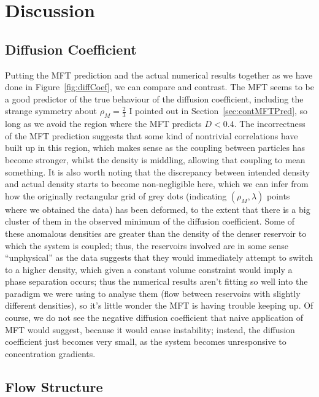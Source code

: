 \section{Discussion} \label{sec:conc}
\subsection{Diffusion Coefficient}
Putting the MFT prediction and the actual numerical results together as we have done in Figure~\ref{fig:diffCoef}, we can compare and contrast. The MFT seems to be a good predictor of the true behaviour of the diffusion coefficient,
including the strange symmetry about $\rho_M=\frac{2}{3}$ I pointed out in Section~\ref{sec:contMFTPred}, so long as we avoid the region where the MFT predicts $D<0.4$. The incorrectness of the MFT prediction suggests that some kind of nontrivial
correlations have built up in this region, which makes sense as the coupling between particles has become stronger, whilst the density is middling, allowing that coupling to mean something. It is also worth noting that the discrepancy between
intended density and actual density starts to become non-negligible here, which we can infer from how the originally rectangular grid of grey dots
(indicating $(\rho_M, \lambda)$ points where we obtained the data) has been deformed, to the extent that there is a big cluster of them in the observed minimum of the diffusion coefficient. Some of these anomalous densities are greater
than the density of the denser reservoir to which the system is coupled; thus, the reservoirs involved are in some sense ``unphysical'' as the data suggests that they would immediately attempt to switch to a higher density, which given a
constant volume constraint would imply a phase separation occurs; thus the numerical results aren't fitting so well into the paradigm we were using to analyse them (flow between reservoirs with slightly different densities),
so it's little wonder the MFT is having trouble keeping up. Of course, we do not see the negative diffusion coefficient that naive application of MFT would suggest, because it would cause instability; instead, the diffusion coefficient just
becomes very small, as the system becomes unresponsive to concentration gradients.
\subsection{Flow Structure}